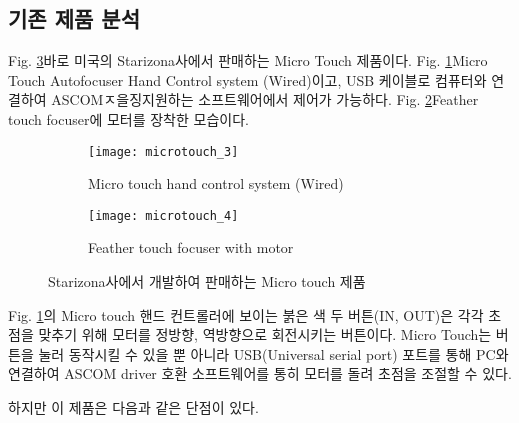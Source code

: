 \clearpage

\subsection{기존 제품 분석}

Fig. \ref{fig:microtouch}\가 바로 미국의 Starizona사에서 판매하는 Micro Touch  제품이다. Fig. \ref{fig:microtouch_3}\가 Micro Touch Autofocuser Hand Control system (Wired)이고, USB 케이블로 컴퓨터와 연결하여 ASCOMㅈ을징지원하는 소프트웨어에서 제어가 가능하다.  Fig. \ref{fig:microtouch_4}\는 Feather touch focuser에 모터를 장착한 모습이다. 


\begin{figure}[H]
		\begin{subfigure}{0.45\textwidth}
		\begin{center}
			\texttt{[image: microtouch\_3]} 
		\end{center}			
			\caption{Micro touch hand control system (Wired)}
			\label{fig:microtouch_3}
		\end{subfigure}
		\begin{subfigure}{0.45\textwidth}
		\begin{center}			
			\texttt{[image: microtouch\_4]}
		\end{center}
			\caption{Feather touch focuser with motor}
			\label{fig:microtouch_4}
		\end{subfigure}
		\caption{Starizona사에서 개발하여 판매하는 Micro touch 제품}
		\label{fig:microtouch}
\end{figure}


Fig. \ref{fig:microtouch_3}의 Micro touch 핸드 컨트롤러에 보이는 붉은 색 두 버튼(IN, OUT)은 각각 초점을 맞추기 위해 모터를 정방향, 역방향으로 회전시키는 버튼이다. Micro Touch는 버튼을 눌러 동작시킬 수 있을 뿐 아니라 USB(Universal serial port) 포트를 통해 PC와 연결하여 ASCOM driver 호환 소프트웨어를 통히 모터를 돌려 초점을 조절할 수 있다. 

하지만 이 제품은 다음과 같은 단점이 있다. 


